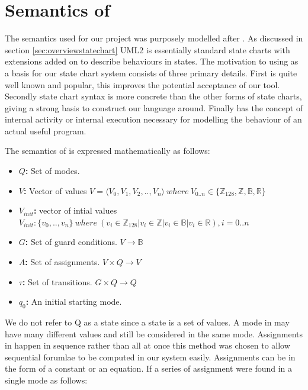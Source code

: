 \section{Semantics of \plcchart}
\label{sec:statechartsem}

The semantics used for our project was purposely modelled after \cite{UML2}. As discussed in section \ref{sec:overviewstatechart} UML2 is essentially standard state charts with extensions added on to describe behaviours in states. The motivation to using \cite{UML2} as a basis for our state chart system consists of three primary details. First \cite{UML2} is quite well known and popular, this improves the potential acceptance of our tool. Secondly \cite{UML2} state chart syntax is more concrete than the other forms of state charts, giving a strong basis to construct our language around. Finally \cite{UML2} has the concept of internal activity or internal execution necessary for modelling the behaviour of an actual useful program.

The semantics of \plcchart is expressed mathematically as follows:

\begin{definition}
	\plcchart
	
\begin{itemize}
	\item \textbf{$Q$:} Set of modes.
	\item \textbf{$V$:} Vector of values $V = \langle V_0,V_1,V_2,..,V_n \rangle \: where \: V_{0..n}\in \lbrace \mathbb{Z}_{128}, \mathbb{Z}, \mathbb{B}, \mathbb{R} \rbrace$
	\item \textbf{$V_{init}$:} vector of intial values $V_{init} : \lbrace v_0,..,v_n \rbrace \: where \: (v_i \in \mathbb{Z}_{128}| v_i \in \mathbb{Z}| v_i \in \mathbb{B}| v_i \in \mathbb{R}), i=0..n$ 
	\item \textbf{$G$:} Set of guard conditions. $V \rightarrow \mathbb{B}$
	\item \textbf{$A$:} Set of assignments. $V \times Q \rightarrow V$
	\item \textbf{$\tau$:} Set of transitions. $G \times Q \rightarrow Q$
	\item \textbf{$q_0$:} An initial starting mode.
\end{itemize}
\end{definition}

We do not refer to Q as a state since a state is a set of values. A mode in \plccharts may have many different values and still be considered in the same mode. Assignments in \plccharts happen in sequence rather than all at once this method was chosen to allow sequential forumlae to be computed in our system easily. Assignments can be in the form of a constant or an equation. If a series of assignment were found in a single mode as follows:

